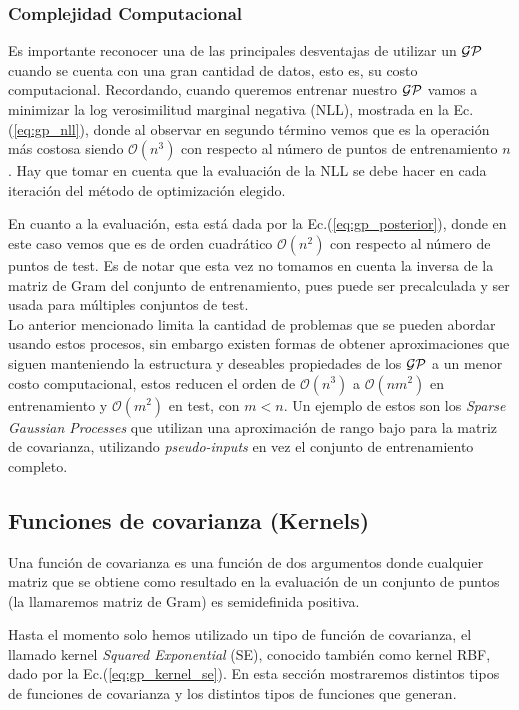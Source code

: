\subsubsection{Complejidad Computacional}

Es importante reconocer una de las principales desventajas de utilizar un $\mathcal{GP}$ cuando se cuenta con una gran cantidad de datos, esto es, su costo computacional.
Recordando, cuando queremos entrenar nuestro $\mathcal{GP}$ vamos a minimizar la log verosimilitud marginal negativa (NLL), mostrada en la Ec.(\ref{eq:gp_nll}), donde al observar en segundo término vemos que es la operación más costosa siendo $\mathcal{O}(n^3)$ con respecto al número de puntos de entrenamiento $n$. Hay que tomar en cuenta que la evaluación de la NLL se debe hacer en cada iteración del método de optimización elegido.

En cuanto a la evaluación, esta está dada por la Ec.(\ref{eq:gp_posterior}), donde en este caso vemos que es de orden cuadrático $\mathcal{O}(n^2)$ con respecto al número de puntos de test. Es de notar que esta vez no tomamos en cuenta la inversa de la matriz de Gram del conjunto de entrenamiento, pues puede ser precalculada y ser usada para múltiples conjuntos de test.\\

Lo anterior mencionado limita la cantidad de problemas que se pueden abordar usando estos procesos, sin embargo existen formas de obtener aproximaciones que siguen manteniendo la estructura y deseables propiedades de los $\mathcal{GP}$ a un menor costo computacional, estos reducen el orden de $\mathcal{O}(n^3)$ a $\mathcal{O}(nm^2)$ en entrenamiento y $\mathcal{O}(m^2)$ en test, con $m<n$. Un ejemplo de estos son los \textit{Sparse Gaussian Processes} que utilizan una aproximación de rango bajo para la matriz de covarianza, utilizando \textit{pseudo-inputs} en vez el conjunto de entrenamiento completo.


\subsection{Funciones de covarianza (Kernels)}

Una función de covarianza es una función de dos argumentos donde cualquier matriz que se obtiene como resultado en la evaluación de un conjunto de puntos (la llamaremos matriz de Gram) es semidefinida positiva.

Hasta el momento solo hemos utilizado un tipo de función de covarianza, el llamado kernel \textit{Squared Exponential} (SE), conocido también como kernel RBF, dado por la Ec.(\ref{eq:gp_kernel_se}). En esta sección mostraremos distintos tipos de funciones de covarianza y los distintos tipos de funciones que generan.

